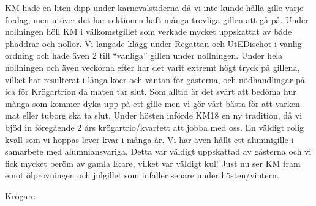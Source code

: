 \documentclass[../_main/handlingar.tex]{subfiles}
\begin{document}
KM hade en liten dipp under karnevalstiderna då vi inte kunde hålla gille varje fredag, men utöver det har sektionen haft många trevliga gillen att gå på. Under nollningen höll KM i välkomstgillet som verkade mycket uppskattat av både phaddrar och nollor. Vi langade klägg under Regattan och UtEDischot i vanlig ordning och hade även 2 till “vanliga” gillen under nollningen. 
Under hela nollningen och även veckorna efter har det varit extremt högt tryck på gillena, vilket har resulterat i långa köer och väntan för gästerna, och nödhandlingar på ica för Krögartrion då maten tar slut. Som alltid är det svårt att bedöma hur många som kommer dyka upp på ett gille men vi gör vårt bästa för att varken mat eller tuborg ska ta slut. 
Under hösten införde KM18 en ny tradition, då vi bjöd in föregående 2 års krögartrio/kvartett att jobba med oss. En väldigt rolig kväll som vi hoppas lever kvar i många år.
Vi har även hållt ett alumnigille i samarbete med alumniansvariga. Detta var väldigt uppskattad av gästerna och vi fick mycket beröm av gamla E:are, vilket var väldigt kul!
Just nu ser KM fram emot ölprovningen och julgillet som infaller senare under hösten/vintern.

\begin{signatures}{1}
    \mvh
    \signature{Malin Heyden}{Krögare}
\end{signatures}
\end{document}
